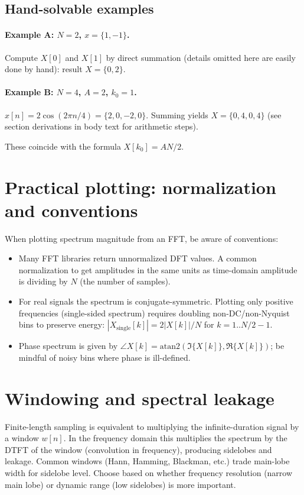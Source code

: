 \documentclass[a4paper]{article}
\begin{document}
\subsection{Hand-solvable examples}
\paragraph{Example A: $N=2$, $x=\{1,-1\}$.}
Compute $X[0]$ and $X[1]$ by direct summation (details omitted here are easily done by hand): result $X=\{0,2\}$.

\paragraph{Example B: $N=4$, $A=2$, $k_0=1$.}
$x[n]=2\cos(2\pi n/4)=\{2,0,-2,0\}$. Summing yields $X=\{0,4,0,4\}$ (see section derivations in body text for arithmetic steps).

These coincide with the formula $X[k_0]=AN/2$.

\section{Practical plotting: normalization and conventions}
When plotting spectrum magnitude from an FFT, be aware of conventions:
\begin{itemize}
\item Many FFT libraries return unnormalized DFT values. A common normalization to get amplitudes in the same units as time-domain amplitude is dividing by $N$ (the number of samples).
\item For real signals the spectrum is conjugate-symmetric. Plotting only positive frequencies (single-sided spectrum) requires doubling non-DC/non-Nyquist bins to preserve energy: $|X_{\text{single}}[k]| = 2|X[k]|/N$ for $k=1..N/2-1$.
\item Phase spectrum is given by $\angle X[k]=\mathrm{atan2}(\Im\{X[k]\},\Re\{X[k]\})$; be mindful of noisy bins where phase is ill-defined.
\end{itemize}

\section{Windowing and spectral leakage}
Finite-length sampling is equivalent to multiplying the infinite-duration signal by a window $w[n]$. In the frequency domain this multiplies the spectrum by the DTFT of the window (convolution in frequency), producing sidelobes and leakage. Common windows (Hann, Hamming, Blackman, etc.) trade main-lobe width for sidelobe level. Choose based on whether frequency resolution (narrow main lobe) or dynamic range (low sidelobes) is more important.
\end{document}
